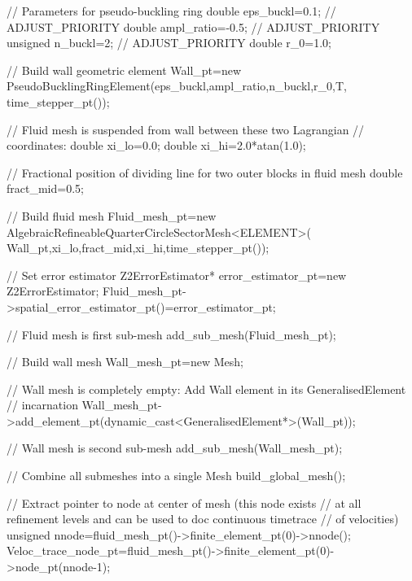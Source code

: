 \begin{DoxyCodeInclude}
 \textcolor{comment}{// Parameters for pseudo-buckling ring }
 \textcolor{keywordtype}{double} eps\_buckl=0.1;  \textcolor{comment}{// ADJUST\_PRIORITY }
 \textcolor{keywordtype}{double} ampl\_ratio=-0.5;  \textcolor{comment}{// ADJUST\_PRIORITY }
 \textcolor{keywordtype}{unsigned} n\_buckl=2; \textcolor{comment}{// ADJUST\_PRIORITY }
 \textcolor{keywordtype}{double} r\_0=1.0;
 
 \textcolor{comment}{// Build wall geometric element}
 Wall\_pt=\textcolor{keyword}{new} PseudoBucklingRingElement(eps\_buckl,ampl\_ratio,n\_buckl,r\_0,T,
                                       time\_stepper\_pt());

 \textcolor{comment}{// Fluid mesh is suspended from wall between these two Lagrangian}
 \textcolor{comment}{// coordinates:}
 \textcolor{keywordtype}{double} xi\_lo=0.0;
 \textcolor{keywordtype}{double} xi\_hi=2.0*atan(1.0);

 \textcolor{comment}{// Fractional position of dividing line for two outer blocks in fluid mesh}
 \textcolor{keywordtype}{double} fract\_mid=0.5;

 \textcolor{comment}{// Build fluid mesh}
 Fluid\_mesh\_pt=\textcolor{keyword}{new} AlgebraicRefineableQuarterCircleSectorMesh<ELEMENT>(
  Wall\_pt,xi\_lo,fract\_mid,xi\_hi,time\_stepper\_pt());

 \textcolor{comment}{// Set error estimator}
 Z2ErrorEstimator* error\_estimator\_pt=\textcolor{keyword}{new} Z2ErrorEstimator;
 Fluid\_mesh\_pt->spatial\_error\_estimator\_pt()=error\_estimator\_pt;
  
 \textcolor{comment}{// Fluid mesh is first sub-mesh}
 add\_sub\_mesh(Fluid\_mesh\_pt);

 \textcolor{comment}{// Build wall mesh }
 Wall\_mesh\_pt=\textcolor{keyword}{new} Mesh;

 \textcolor{comment}{// Wall mesh is completely empty: Add Wall element in its GeneralisedElement}
 \textcolor{comment}{// incarnation}
 Wall\_mesh\_pt->add\_element\_pt(dynamic\_cast<GeneralisedElement*>(Wall\_pt));

 \textcolor{comment}{// Wall mesh is second sub-mesh}
 add\_sub\_mesh(Wall\_mesh\_pt);

 \textcolor{comment}{// Combine all submeshes into a single Mesh}
 build\_global\_mesh();

 \textcolor{comment}{// Extract pointer to node at center of mesh (this node exists}
 \textcolor{comment}{// at all refinement levels and can be used to doc continuous timetrace}
 \textcolor{comment}{// of velocities)}
 \textcolor{keywordtype}{unsigned} nnode=fluid\_mesh\_pt()->finite\_element\_pt(0)->nnode();
 Veloc\_trace\_node\_pt=fluid\_mesh\_pt()->finite\_element\_pt(0)->node\_pt(nnode-1);


\end{DoxyCodeInclude}
